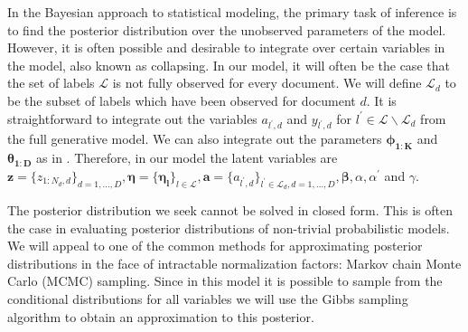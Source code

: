 
\label{sec:inference} In the Bayesian approach to statistical modeling,
the primary task of inference is to find the posterior distribution
over the unobserved parameters of the model. However, it is often
possible and desirable to integrate over certain variables in the
model, also known as collapsing. In our model, it will often be the
case that the set of labels $\mathcal{L}$ is not fully observed for
every document. We will define $\mathcal{L}_{d}$ to be the subset
of labels which have been observed for document $d$. It is straightforward
to integrate out the variables $a_{l^{\prime},d}$ and $y_{l^{\prime},d}$
for $l^{\prime}\in\mathcal{L}\backslash\mathcal{L}_{d}$ from the
full generative model. We can also integrate out the parameters $\mathbf{\phi_{1:K}}$
and $\mathbf{\theta_{1:D}}$ as in \citet{Griffiths04}. Therefore,
in our model the latent variables are $\mathbf{z}=\{z_{1:N_{d},d}\}_{d=1,\ldots,D},\mathbf{\eta}=\{\mathbf{\eta_{l}}\}_{l\in\mathcal{L}},\mathbf{a}=\{a_{l^{\prime},d}\}_{l^{\prime}\in\mathcal{L}_{d},d=1,\ldots,D},\mathbf{\beta},\alpha,\alpha^{\prime}$
and $\gamma$.

The posterior distribution we seek cannot be solved in closed form.
This is often the case in evaluating posterior distributions of non-trivial
probabilistic models. We will appeal to one of the common methods
for approximating posterior distributions in the face of intractable
normalization factors: Markov chain Monte Carlo (MCMC) sampling. Since
in this model it is possible to sample from the conditional distributions
for all variables we will use the Gibbs sampling algorithm to obtain
an approximation to this posterior. %



